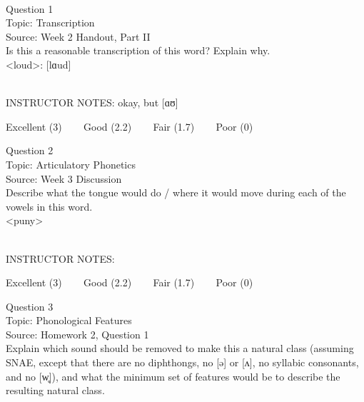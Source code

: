 \documentclass[12pt]{article}
\begin{document}
\begin{center}
\textbf{{\color{red}{\HUGE END OF EXAM}}}\\

\end{center}
\newpage

\begin{center}
\textbf{{\color{blue}{\HUGE START OF EXAM\\}}}

\textbf{{\color{blue}{\HUGE Student ID: 52421\\}}}

\textbf{{\color{blue}{\HUGE \\}}}

\end{center}
\newpage

{\large Question 1}\\

Topic: Transcription\\
Source: Week 2 Handout, Part II\\

Is this a reasonable transcription of this word? Explain why.\\

<loud>: {[lɑud]}


~\\
INSTRUCTOR NOTES: okay, but [ɑʊ]


\vfill
Excellent (3) ~~~ Good (2.2) ~~~ Fair (1.7) ~~~ Poor (0)
\newpage

{\large Question 2}\\

Topic: Articulatory Phonetics\\
Source: Week 3 Discussion\\

Describe what the tongue would do / where it would move during each of the vowels in this word.\\

<puny>


~\\
INSTRUCTOR NOTES: 


\vfill
Excellent (3) ~~~ Good (2.2) ~~~ Fair (1.7) ~~~ Poor (0)
\newpage

{\large Question 3}\\

Topic: Phonological Features\\
Source: Homework 2, Question 1\\

Explain which sound should be removed to make this a natural class (assuming SNAE, except that there are no diphthongs, no [ə] or [ʌ], no syllabic consonants, and no [w̥]), and what the minimum set of features would be to describe the resulting natural class.\\
\end{document}
